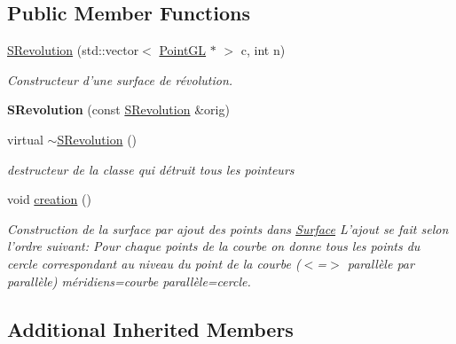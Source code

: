 \subsection*{Public Member Functions}
\begin{DoxyCompactItemize}
\item 
\hyperlink{classSRevolution_a57a7215ff953ee4f6ec1ccb8d330b087}{S\-Revolution} (std\-::vector$<$ \hyperlink{classPointGL}{Point\-G\-L} $\ast$ $>$ c, int n)
\begin{DoxyCompactList}\small\item\em Constructeur d'une surface de révolution. \end{DoxyCompactList}\item 
\hypertarget{classSRevolution_a846beb4fa33dc09ce2d6cf49ee843960}{{\bfseries S\-Revolution} (const \hyperlink{classSRevolution}{S\-Revolution} \&orig)}\label{classSRevolution_a846beb4fa33dc09ce2d6cf49ee843960}

\item 
\hypertarget{classSRevolution_ae78dddc5cd493f71796b4ac21b840e9f}{virtual \hyperlink{classSRevolution_ae78dddc5cd493f71796b4ac21b840e9f}{$\sim$\-S\-Revolution} ()}\label{classSRevolution_ae78dddc5cd493f71796b4ac21b840e9f}

\begin{DoxyCompactList}\small\item\em destructeur de la classe qui détruit tous les pointeurs \end{DoxyCompactList}\item 
\hypertarget{classSRevolution_af42d610f9cd60bf946ff032d5d02d203}{void \hyperlink{classSRevolution_af42d610f9cd60bf946ff032d5d02d203}{creation} ()}\label{classSRevolution_af42d610f9cd60bf946ff032d5d02d203}

\begin{DoxyCompactList}\small\item\em Construction de la surface par ajout des points dans \hyperlink{classSurface}{Surface} L'ajout se fait selon l'ordre suivant\-: Pour chaque points de la courbe on donne tous les points du cercle correspondant au niveau du point de la courbe ($<$=$>$ parallèle par parallèle) méridiens=courbe parallèle=cercle. \end{DoxyCompactList}\end{DoxyCompactItemize}
\subsection*{Additional Inherited Members}


